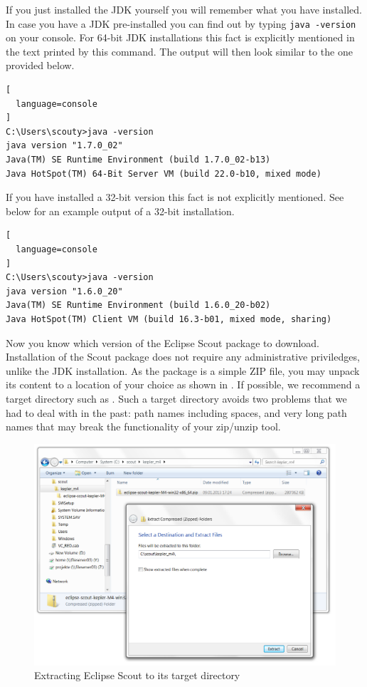 \documentclass[a4paper,10pt,twoside]{book}
\begin{document}
If you just installed the JDK yourself you will remember what you have installed. 
In case you have a JDK pre-installed you can find out by typing \texttt{java -version} on your console.
For 64-bit JDK installations this fact is explicitly mentioned in the text printed by this command.
The output will then look similar to the one provided below.

\begin{lstlisting}[
  language=console
]
C:\Users\scouty>java -version
java version "1.7.0_02"
Java(TM) SE Runtime Environment (build 1.7.0_02-b13)
Java HotSpot(TM) 64-Bit Server VM (build 22.0-b10, mixed mode)
\end{lstlisting}

If you have installed a 32-bit version this fact is not explicitly mentioned.
See below for an example output of a 32-bit installation.

\begin{lstlisting}[
  language=console
]
C:\Users\scouty>java -version
java version "1.6.0_20"
Java(TM) SE Runtime Environment (build 1.6.0_20-b02)
Java HotSpot(TM) Client VM (build 16.3-b01, mixed mode, sharing)
\end{lstlisting}

Now you know which version of the Eclipse Scout package to download.
Installation of the Scout package does not require any administrative priviledges, unlike the JDK installation.
As the package is a simple ZIP file, you may unpack its content to a location of your choice as shown in . 
If possible, we recommend a target directory such as 
.
Such a target directory avoids two problems that we had to deal with in the past:
path names including spaces, and very long path names that may break the functionality of your zip/unzip tool.

\begin{figure}
\includegraphics[width=15cm]{scout_extract_zip.png}
\caption{Extracting Eclipse Scout to its target directory}
\end{figure}
\end{document}
